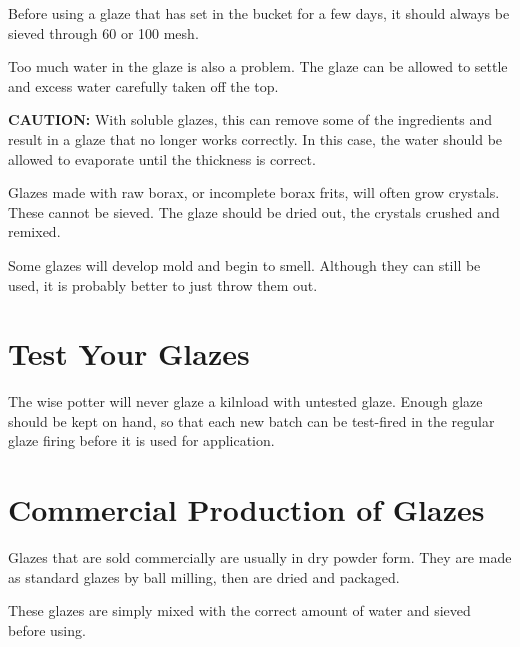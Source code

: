 Before using a glaze that has set in the bucket for a few days, it should 
always be sieved through 60 or 100 mesh.

Too much water in the glaze is also a problem. The glaze can be allowed to 
settle and excess water carefully taken off the top. 

\textbf{CAUTION:} With soluble glazes, this can remove some of the ingredients 
and result in a glaze that no longer works correctly. In this case, the water 
should be allowed to evaporate until the thickness is correct.

Glazes made with raw borax, or incomplete borax frits, will often grow 
crystals. These cannot be sieved. The glaze should be dried out, the crystals 
crushed and remixed.

Some glazes will develop mold and begin to smell. Although they can still be 
used, it is probably better to just throw them out.
\section{Test Your Glazes}
The wise potter will never glaze a kilnload with untested glaze. Enough glaze 
should be kept on hand, so that each new batch can be test-fired in the regular 
glaze firing before it is used for application.
\section{Commercial Production of Glazes}
Glazes that are sold commercially are usually in dry powder form. They are made 
as standard glazes by ball milling, then are dried and packaged.

These glazes are simply mixed with the correct amount of water and sieved 
before using.
